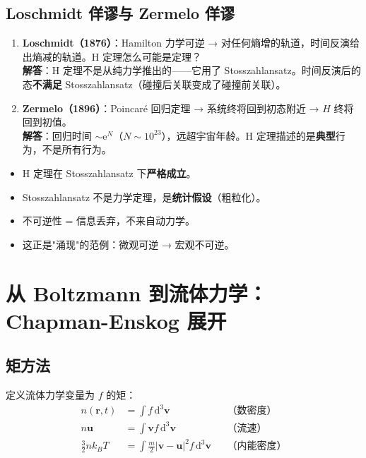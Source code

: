 \documentclass[11pt,a4paper]{article}
\newcommand{\ee}{\mathrm{e}}
\newcommand{\ri}{\mathbf{r}}
\newcommand{\vi}{\mathbf{v}}
\begin{document}
\subsection{Loschmidt 佯谬与 Zermelo 佯谬}

\begin{enumerate}
\item \textbf{Loschmidt（1876）}：Hamilton 力学可逆 → 对任何熵增的轨道，时间反演给出熵减的轨道。H 定理怎么可能是定理？\\
\textbf{解答}：H 定理不是从纯力学推出的——它用了 Stosszahlansatz。时间反演后的态\textbf{不满足} Stosszahlansatz（碰撞后关联变成了碰撞前关联）。

\item \textbf{Zermelo（1896）}：Poincaré 回归定理 → 系统终将回到初态附近 → $H$ 终将回到初值。\\
\textbf{解答}：回归时间 $\sim \ee^N$（$N\sim 10^{23}$），远超宇宙年龄。H 定理描述的是\textbf{典型}行为，不是所有行为。
\end{enumerate}

\begin{tcolorbox}[colback=blue!5, title=物理总结]
\begin{itemize}
\item H 定理在 Stosszahlansatz 下\textbf{严格成立}。
\item Stosszahlansatz 不是力学定理，是\textbf{统计假设}（粗粒化）。
\item 不可逆性 = 信息丢弃，不来自动力学。
\item 这正是"涌现"的范例：微观可逆 → 宏观不可逆。
\end{itemize}
\end{tcolorbox}

\section{从 Boltzmann 到流体力学：Chapman-Enskog 展开}

\subsection{矩方法}

定义流体力学变量为 $f$ 的矩：
\begin{align}
n(\ri,t) &= \int f\,\mathrm{d}^3\vi & &\text{（数密度）}\\
n\mathbf{u} &= \int \vi f\,\mathrm{d}^3\vi & &\text{（流速）}\\
\frac{3}{2}nk_BT &= \int \frac{m}{2}|\vi-\mathbf{u}|^2 f\,\mathrm{d}^3\vi & &\text{（内能密度）}
\end{align}
\end{document}

